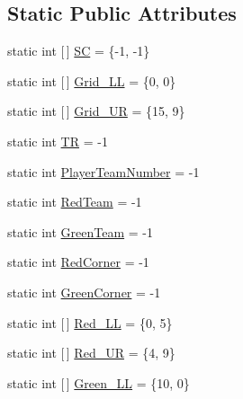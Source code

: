 \subsection*{Static Public Attributes}
\begin{DoxyCompactItemize}
\item 
static int \mbox{[}$\,$\mbox{]} \hyperlink{classca_1_1mcgill_1_1ecse211_1_1project_1_1_game_parameters_aae8c69151bc01acce692b9119323bb46}{SC} = \{-\/1, -\/1\}
\item 
static int \mbox{[}$\,$\mbox{]} \hyperlink{classca_1_1mcgill_1_1ecse211_1_1project_1_1_game_parameters_aec739d9ebcbd75db6a77ec288ff974cf}{Grid\+\_\+\+LL} = \{0, 0\}
\item 
static int \mbox{[}$\,$\mbox{]} \hyperlink{classca_1_1mcgill_1_1ecse211_1_1project_1_1_game_parameters_ab79c9c891076d29cbe5ac053f617c381}{Grid\+\_\+\+UR} = \{15, 9\}
\item 
static int \hyperlink{classca_1_1mcgill_1_1ecse211_1_1project_1_1_game_parameters_a5a299e93e098c89d12be1072947d3bcb}{TR} = -\/1
\item 
static int \hyperlink{classca_1_1mcgill_1_1ecse211_1_1project_1_1_game_parameters_a15bc3c24f73d1ad29b6fe7fd9e1ef0e6}{Player\+Team\+Number} = -\/1
\item 
static int \hyperlink{classca_1_1mcgill_1_1ecse211_1_1project_1_1_game_parameters_a51c899921677197f960f39e6ed42c780}{Red\+Team} = -\/1
\item 
static int \hyperlink{classca_1_1mcgill_1_1ecse211_1_1project_1_1_game_parameters_aca550f5067892ceeb8f44ede61bbc90e}{Green\+Team} = -\/1
\item 
static int \hyperlink{classca_1_1mcgill_1_1ecse211_1_1project_1_1_game_parameters_acf0dce5eb9dc754248f0c3de997d2809}{Red\+Corner} = -\/1
\item 
static int \hyperlink{classca_1_1mcgill_1_1ecse211_1_1project_1_1_game_parameters_a7fe7f10f96800fbd5f2331e3aa608b66}{Green\+Corner} = -\/1
\item 
static int \mbox{[}$\,$\mbox{]} \hyperlink{classca_1_1mcgill_1_1ecse211_1_1project_1_1_game_parameters_ae3eb3c87467d3a7760cd619a96379a9e}{Red\+\_\+\+LL} = \{0, 5\}
\item 
static int \mbox{[}$\,$\mbox{]} \hyperlink{classca_1_1mcgill_1_1ecse211_1_1project_1_1_game_parameters_a81ddd789119962c32fe6d7f9cce4f240}{Red\+\_\+\+UR} = \{4, 9\}
\item 
static int \mbox{[}$\,$\mbox{]} \hyperlink{classca_1_1mcgill_1_1ecse211_1_1project_1_1_game_parameters_a24e38b735e194403bf2b9877241969c1}{Green\+\_\+\+LL} = \{10, 0\}

\end{DoxyCompactItemize}

